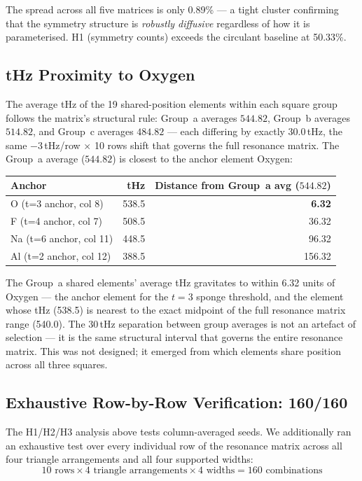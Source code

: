 \documentclass[preprint]{iacrtrans}
\begin{document}
The spread across all five matrices is only 0.89\% — a tight cluster
confirming that the symmetry structure is \emph{robustly diffusive}
regardless of how it is parameterised. H1 (symmetry counts) exceeds the
circulant baseline at 50.33\%.

\subsection{tHz Proximity to Oxygen}

The average tHz of the 19 shared-position elements within each square
group follows the matrix's structural rule: Group~a averages $544.82$,
Group~b averages $514.82$, and Group~c averages $484.82$ — each differing
by exactly $30.0$\,tHz, the same $-3$\,tHz/row $\times$ 10 rows shift
that governs the full resonance matrix. The Group~a average ($544.82$)
is closest to the anchor element Oxygen:

\begin{center}
\begin{tabular}{lrr}
\toprule
Anchor & tHz & Distance from Group~a avg ($544.82$) \\
\midrule
O  (t=3 anchor, col 8) & 538.5 & \textbf{6.32} \\
F  (t=4 anchor, col 7) & 508.5 & 36.32 \\
Na (t=6 anchor, col 11) & 448.5 & 96.32 \\
Al (t=2 anchor, col 12) & 388.5 & 156.32 \\
\bottomrule
\end{tabular}
\end{center}

The Group~a shared elements' average tHz gravitates to within 6.32 units
of Oxygen — the anchor element for the $t=3$ sponge threshold, and the
element whose tHz (538.5) is nearest to the exact midpoint of the full
resonance matrix range (540.0). The 30\,tHz separation between group
averages is not an artefact of selection — it is the same structural
interval that governs the entire resonance matrix. This was not designed;
it emerged from which elements share position across all three squares.

\subsection{Exhaustive Row-by-Row Verification: 160/160}
\label{sec:exhaustive}

The H1/H2/H3 analysis above tests column-averaged seeds. We additionally
ran an exhaustive test over every individual row of the resonance matrix
across all four triangle arrangements and all four supported widths:
\[
  10 \text{ rows} \times 4 \text{ triangle arrangements} \times 4 \text{ widths}
  = 160 \text{ combinations}
\]
\end{document}
